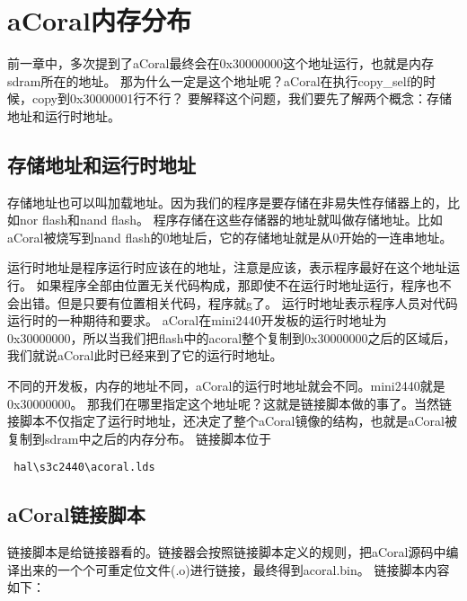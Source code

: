 \chapter{aCoral内存分布}
前一章中，多次提到了aCoral最终会在0x30000000这个地址运行，也就是内存sdram所在的地址。
那为什么一定是这个地址呢？aCoral在执行copy\_self的时候，copy到0x30000001行不行？
要解释这个问题，我们要先了解两个概念：存储地址和运行时地址。

\section{存储地址和运行时地址}

存储地址也可以叫加载地址。因为我们的程序是要存储在非易失性存储器上的，比如nor flash和nand flash。
程序存储在这些存储器的地址就叫做存储地址。比如aCoral被烧写到nand flash的0地址后，它的存储地址就是从0开始的一连串地址。

运行时地址是程序运行时应该在的地址，注意是应该，表示程序最好在这个地址运行。
如果程序全部由位置无关代码构成，那即使不在运行时地址运行，程序也不会出错。但是只要有位置相关代码，程序就g了。
运行时地址表示程序人员对代码运行时的一种期待和要求。
aCoral在mini2440开发板的运行时地址为0x30000000，所以当我们把flash中的acoral整个复制到0x30000000之后的区域后，
我们就说aCoral此时已经来到了它的运行时地址。

不同的开发板，内存的地址不同，aCoral的运行时地址就会不同。mini2440就是0x30000000。
那我们在哪里指定这个地址呢？这就是链接脚本做的事了。当然链接脚本不仅指定了运行时地址，还决定了整个aCoral镜像的结构，也就是aCoral被复制到sdram中之后的内存分布。
链接脚本位于
\begin{lstlisting}
 hal\s3c2440\acoral.lds
\end{lstlisting}

\section{aCoral链接脚本}

链接脚本是给链接器看的。链接器会按照链接脚本定义的规则，把aCoral源码中编译出来的一个个可重定位文件(.o)进行链接，最终得到acoral.bin。
链接脚本内容如下：

